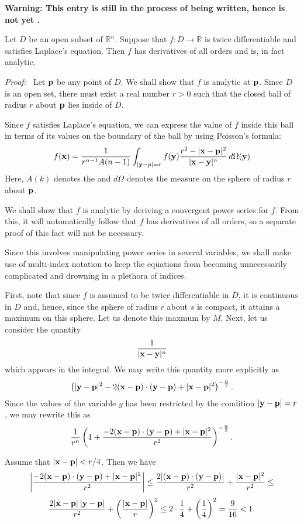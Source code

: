 \documentclass[12pt]{article}
\begin{document}
{\bf Warning: This entry is still in the process of being written, hence is not yet .}

Let $D$ be an open subset of $\mathbb{R}^n$.  Suppose that $f \colon D \to \mathbb{R}$ is twice differentiable and satisfies Laplace's equation.  Then $f$ has derivatives of all orders and is, in fact analytic.

{\it Proof: \,}  Let ${\bf p}$ be any point of $D$.  We shall show that $f$ is analytic at ${\bf p}$.  Since $D$ is an open set, there must exist a real number $r > 0$ such that the closed ball of radius $r$ about ${\bf p}$ lies inside of $D$.

Since $f$ satisfies Laplace's equation, we can express the value of $f$ inside this ball in terms of its values on the boundary of the ball by using Poisson's formula:
 $$f({\bf x}) = {1 \over r^{n-1} A(n-1)} \int_{|{\bf y} - p| = r} f({\bf y}) {r^2 - |{\bf x} - {\bf p}|^2 \over |{\bf x} - {\bf y}|^n} \, d\Omega({\bf y})$$
Here, $A(k)$ denotes the  and $d\Omega$ denotes the measure on the sphere of radius $r$ about ${\bf p}$.

We shall show that $f$ is analytic by deriving a convergent power series for $f$.  From this, it will automatically follow that $f$ has derivatives of all orders, so a separate proof of this fact will not be necessary.  

Since this involves manipulating power series in several variables, we shall make use of multi-index notation to keep the equations from becoming unnecessarily complicated and drowning in a plethora of indices.

First, note that since $f$ is assumed to be twice differentiable in $D$, it is continuous in $D$ and, hence, since the sphere of radius $r$ about $s$ is compact, it attains a maximum on this sphere.  Let us denote this maxmum by $M$.  Next, let us consider the quantity
 $${1 \over |{\bf x} - {\bf y}|^n}$$
which appears in the integral.  We may write this quantity more explicitly as
 $$\left( |{\bf y} - {\bf p}|^2 - 2 ({\bf x} - {\bf p}) \cdot ({\bf y} - {\bf p}) + |{\bf x} - {\bf p}|^2 \right)^{-{n \over 2}}.$$
Since the values of the variable $y$ has been restricted by the condition $|{\bf y} - {\bf p}| = r$, we may rewrite this as
 $${1 \over r^n} \left( 1 + {- 2({\bf x} - {\bf p}) \cdot ({\bf y} - {\bf p}) + |{\bf x} - {\bf p}|^2 \over r^2} \right)^{-{n \over 2}}.$$

Assume that $|{\bf x} - {\bf p}| < r/4$.  Then we have 
 $$\left| {- 2({\bf x} - {\bf p}) \cdot ({\bf y} - {\bf p}) + |{\bf x} - {\bf p}|^2 \over r^2} \right| \le {2 |({\bf x} - {\bf p}) \cdot ({\bf y} - {\bf p})| \over r^2} + {|{\bf x} - {\bf p}|^2 \over r^2} \le $$ 
$${2 |{\bf x} - {\bf p}| \> |{\bf y} - {\bf p}| \over r^2} + \left( {|{\bf x} - {\bf p}| \over r} \right)^2 \le 2 \cdot {1 \over 4} + \left( {1 \over 4} \right)^2 = {9 \over 16} < 1.$$
\end{document}
